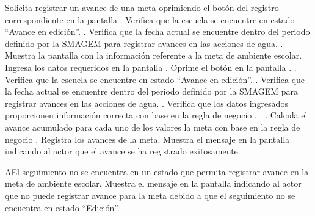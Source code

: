  \begin{UCtrayectoria}
    \UCpaso[\UCactor] Solicita registrar un avance de una meta oprimiendo el botón \botMetas del registro correspondiente en la pantalla .
    \UCpaso[\UCsist] Verifica que la escuela se encuentre en estado ``Avance en edición''. .
    \UCpaso[\UCsist] Verifica que la fecha actual se encuentre dentro del periodo definido por la SMAGEM para registrar avances en las acciones de agua. .
    \UCpaso[\UCsist] Muestra la pantalla  con la información referente a la meta de ambiente escolar. 
    \UCpaso[\UCactor] Ingresa los datos requeridos en la pantalla . \label{cus4:RegAvance}
    \UCpaso[\UCactor] Oprime el botón  en la pantalla . .
    \UCpaso[\UCsist] Verifica que la escuela se encuentre en estado ``Avance en edición''. .
    \UCpaso[\UCsist] Verifica que la fecha actual se encuentre dentro del periodo definido por la SMAGEM para registrar avances en las acciones de agua. .
    \UCpaso[\UCsist] Verifica que los datos ingresados proporcionen información correcta con base en la regla de negocio . . .  
    \UCpaso[\UCsist] Calcula el avance acumulado para cada uno de los valores  la meta con base en la regla de negocio .
    \UCpaso[\UCsist] Registra los avances de la meta.
    \UCpaso[\UCsist] Muestra el mensaje  en la pantalla  indicando al actor que el avance se ha registrado exitosamente.
 \end{UCtrayectoria}
 
    \begin{UCtrayectoriaA}{A}{El seguimiento no se encuentra en un estado que permita registrar avance en la meta de ambiente escolar.}
    \UCpaso[\UCsist] Muestra el mensaje  en la pantalla  indicando al actor que no puede registrar avance para la meta debido a que el seguimiento no se encuentra en estado ``Edición''. 
    \end{UCtrayectoriaA}
 
